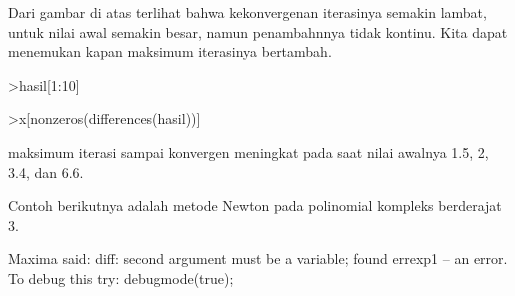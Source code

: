 \documentclass{article}
\begin{document}
\begin{eulernotebook}
\begin{eulercomment}
\begin{eulercomment}
\begin{eulercomment}
\begin{eulercomment}
\begin{eulercomment}
\begin{eulercomment}
\begin{eulercomment}
\begin{eulercomment}
\begin{eulercomment}
\begin{eulercomment}
\begin{eulercomment}
\begin{eulercomment}
\begin{eulercomment}
\begin{eulercomment}
\begin{eulercomment}
\begin{eulercomment}
\begin{eulercomment}
\begin{eulercomment}
\begin{eulercomment}
\begin{eulercomment}
\begin{eulercomment}
\begin{eulercomment}
\begin{eulercomment}
\begin{eulercomment}
\begin{eulercomment}
\begin{eulercomment}
\begin{eulercomment}
\begin{eulercomment}
\begin{eulercomment}
\begin{eulercomment}
\begin{eulercomment}
\begin{eulercomment}
\begin{eulercomment}
\begin{eulercomment}
\begin{eulercomment}
\begin{eulercomment}
\begin{eulercomment}
Dari gambar di atas terlihat bahwa kekonvergenan iterasinya semakin
lambat, untuk nilai awal semakin besar, namun penambahnnya tidak
kontinu. Kita dapat menemukan kapan maksimum iterasinya bertambah.
\end{eulercomment}
\begin{eulerprompt}
>hasil[1:10]
\end{eulerprompt}
\begin{euleroutput}
  [4,  5,  5,  5,  5,  5,  6,  6,  6,  6]
\end{euleroutput}
\begin{eulerprompt}
>x[nonzeros(differences(hasil))]
\end{eulerprompt}
\begin{euleroutput}
  [1.5,  2,  3.4,  6.6]
\end{euleroutput}
\begin{eulercomment}
maksimum iterasi sampai konvergen meningkat pada saat nilai awalnya
1.5, 2, 3.4, dan 6.6.

Contoh berikutnya adalah metode Newton pada polinomial kompleks
berderajat 3.
\end{eulercomment}
\begin{euleroutput}
  Maxima said:
  diff: second argument must be a variable; found errexp1
   -- an error. To debug this try: debugmode(true);
  

\end{euleroutput}
\end{eulercomment}
\end{eulercomment}
\end{eulercomment}
\end{eulercomment}
\end{eulercomment}
\end{eulercomment}
\end{eulercomment}
\end{eulercomment}
\end{eulercomment}
\end{eulercomment}
\end{eulercomment}
\end{eulercomment}
\end{eulercomment}
\end{eulercomment}
\end{eulercomment}
\end{eulercomment}
\end{eulercomment}
\end{eulercomment}
\end{eulercomment}
\end{eulercomment}
\end{eulercomment}
\end{eulercomment}
\end{eulercomment}
\end{eulercomment}
\end{eulercomment}
\end{eulercomment}
\end{eulercomment}
\end{eulercomment}
\end{eulercomment}
\end{eulercomment}
\end{eulercomment}
\end{eulercomment}
\end{eulercomment}
\end{eulercomment}
\end{eulercomment}
\end{eulercomment}
\end{eulernotebook}
\end{document}
